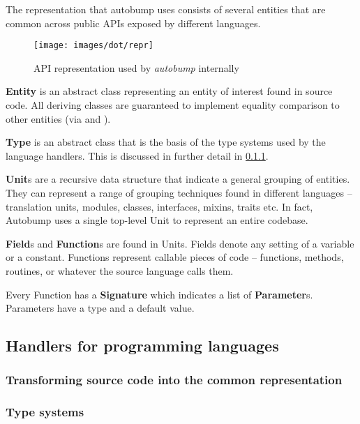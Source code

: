 \documentclass{l4proj}
\begin{document}
The representation that autobump uses consists of several entities
that are common across public APIs exposed by different languages.

\begin{figure}
\centering
\texttt{[image: images/dot/repr]}
\caption{API representation used by \textit{autobump} internally}
\end{figure}

\textbf{Entity} is an abstract class representing an entity of
interest found in source code. All deriving classes are guaranteed to
implement equality comparison to other entities (via
\texttt{} and \texttt{}).

\textbf{Type} is an abstract class that is the basis of the type
systems used by the language handlers. This is discussed in further
detail in \ref{TypeSystems}.

\textbf{Unit}s are a recursive data structure that indicate a
general grouping of entities. They can represent a range of grouping
techniques found in different languages -- translation units, modules,
classes, interfaces, mixins, traits etc. In fact, Autobump uses a
single top-level Unit to represent an entire codebase.

\textbf{Field}s and \textbf{Function}s are found in Units. Fields
denote any setting of a variable or a constant. Functions represent
callable pieces of code -- functions, methods, routines, or whatever
the source language calls them.

Every Function has a \textbf{Signature} which indicates a list of
\textbf{Parameter}s. Parameters have a type and a default value.


\label{LanguageHandlers}
\subsection{Handlers for programming languages}

\subsubsection{Transforming source code into the common representation}


\label{TypeSystems}
\subsubsection{Type systems}
\end{document}
